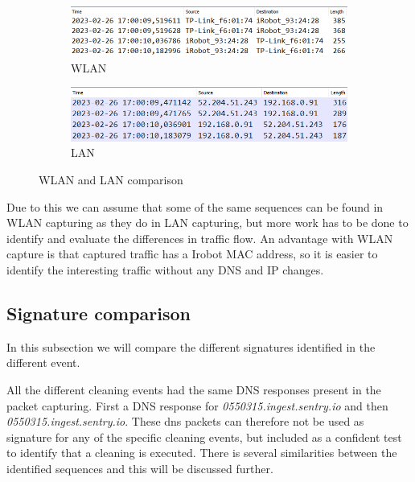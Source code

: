 \begin{figure}[H]
    \centering
    \begin{subfigure}[b]{0.9\textwidth}
        \includegraphics[width=\textwidth]{figures/WLANLANComparison.png}
        \caption{WLAN}
    \end{subfigure}
    \quad
    \begin{subfigure}[b]{0.9\textwidth}
        \includegraphics[width=\textwidth]{figures/LANWLANcomparison.png}
        \caption{LAN}
    \end{subfigure}
    
    \caption{WLAN and LAN comparison}
    \label{fig:WLANLANHeader}
\end{figure}


Due to this we can assume that some of the same sequences can be found in WLAN capturing as they do in LAN capturing, but more work has to be done to identify and evaluate the differences in traffic flow. An advantage with WLAN capture is that captured traffic has a Irobot MAC address, so it is easier to identify the interesting traffic without any DNS and IP changes. 




\subsection{Signature comparison}
In this subsection we will compare the different signatures identified in the different event. 

All the different cleaning events had the same DNS responses present in the packet capturing. First a DNS response for \textit{0550315.ingest.sentry.io} and then \textit{0550315.ingest.sentry.io}. These dns packets can therefore not be used as signature for any of the specific cleaning events, but included as a confident test to identify that a cleaning is executed. There is several similarities between the identified sequences and this will be discussed further.

